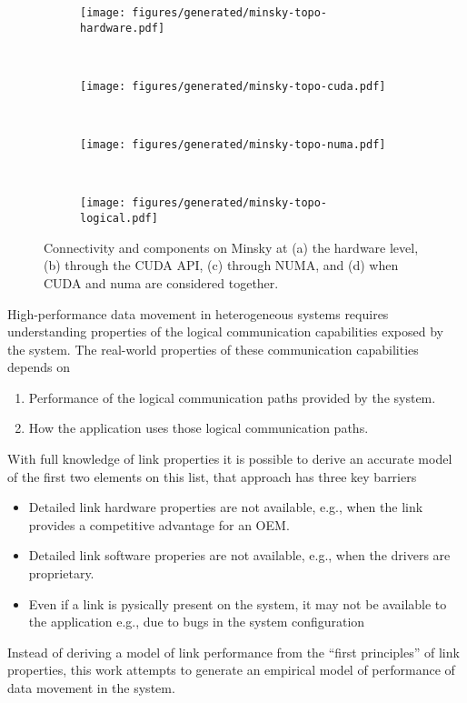 \begin{figure}[ht]
    \centering
    \begin{subfigure}[b]{0.45\textwidth}
        \texttt{[image: figures/generated/minsky-topo-hardware.pdf]}
        \caption{}
        \label{fig:minsky-topo-hardware}
    \end{subfigure}
    ~
    \begin{subfigure}[b]{0.45\textwidth}
        \texttt{[image: figures/generated/minsky-topo-cuda.pdf]}
        \caption{}
        \label{fig:minsky-topo-cuda}
    \end{subfigure}
    \\
    \begin{subfigure}[b]{0.3\textwidth}
        \texttt{[image: figures/generated/minsky-topo-numa.pdf]}
        \caption{}
        \label{fig:minsky-topo-numa}
    \end{subfigure}
    ~
    \begin{subfigure}[b]{0.3\textwidth}
        \texttt{[image: figures/generated/minsky-topo-logical.pdf]}
        \caption{}
        \label{fig:minsky-topo-logical}
    \end{subfigure}
    \caption[]{
        Connectivity and components on Minsky at (a) the hardware level, (b) through the CUDA API, (c) through NUMA, and (d) when CUDA and numa are considered together.
    }
    \label{fig:minsky-hardware-logical}
\end{figure}


High-performance data movement in heterogeneous systems requires understanding properties of the logical communication capabilities exposed by the system.
The real-world properties of these communication capabilities depends on 
\begin{enumerate}
    \item Performance of the logical communication paths provided by the system.
    \item How the application uses those logical communication paths.
\end{enumerate}

With full knowledge of link properties it is possible to derive an accurate model of the first two elements on this list, that approach has three key barriers
\begin{itemize}
    \item Detailed link hardware properties are not available, e.g., when the link provides a competitive advantage for an OEM.
    \item Detailed link software properies are not available, e.g., when the drivers are proprietary.
    \item Even if a link is pysically present on the system, it may not be available to the application {e.g., due to bugs in the system configuration}
\end{itemize}
Instead of deriving a model of link performance from the ``first principles'' of link properties, this work attempts to generate an empirical model of performance of data movement in the system.


